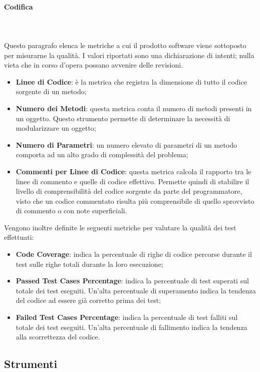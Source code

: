 			\paragraph{Codifica} \mbox{} \\ \mbox{} \\
			Questo paragrafo elenca le metriche a cui il prodotto software viene sottoposto per misurarne la qualità.
			I valori riportati sono una dichiarazione di intenti; nulla vieta che in corso d'opera possano avvenire delle revisioni.
			\begin{itemize}
			\item \textbf{Linee di Codice}: è la metrica che registra la dimensione di tutto il codice sorgente di un metodo;
			\item \textbf{Numero dei Metodi}: questa metrica conta il numero di metodi presenti in un oggetto. Questo strumento permette di determinare la necessità di modularizzare un oggetto;
			\item \textbf{Numero di Parametri}: un numero elevato di parametri di un metodo comporta ad un alto grado di complessità del problema;
			\item \textbf{Commenti per Linee di Codice}: questa metrica calcola il rapporto tra le linee di commento e quelle di codice effettivo. Permette quindi di stabilire il livello di comprensibilità del codice sorgente da parte del programmatore, visto che un codice commentato risulta più comprensibile di quello sprovvisto di commento o con note superficiali.
			\end{itemize}
			Vengono inoltre definite le seguenti metriche per valutare la qualità dei test effettuati: \begin{itemize}
			\item \textbf{Code Coverage}: indica la percentuale di righe di codice percorse durante il test sulle righe totali durante la loro esecuzione;
			\item \textbf{Passed Test Cases Percentage}: indica la percentuale
di test superati sul totale dei test eseguiti. Un'alta percentuale di superamento
indica la tendenza del codice ad essere già corretto prima dei test;
			\item \textbf{Failed Test Cases Percentage}: indica la percentuale
di test falliti sul totale dei test eseguiti. Un'alta percentuale di fallimento indica la tendenza alla scorrettezza del codice.
			\end{itemize}
			\pagebreak
	\subsection{Strumenti}
